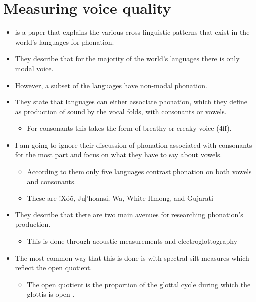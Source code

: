 \section{Measuring voice quality} \label{sec:measuring_voice_quality}




\begin{itemize}
    \item \citet{espositoCrosslinguisticPatternsPhonation2020} is a paper that explains the various cross-linguistic patterns that exist in the world's languages for phonation. 
    \item They describe that for the majority of the world's languages there is only modal voice. 
    \item However, a subset of the languages have non-modal phonation. 
    \item They state that languages can either associate phonation, which they define as production of sound by the vocal folds, with consonants or vowels. 
    \begin{itemize}
        \item For consonants this takes the form of breathy or creaky voice (4ff).
    \end{itemize}
    \item I am going to ignore their discussion of phonation associated with consonants for the most part and focus on what they have to say about vowels. 
    \begin{itemize}
        \item According to them only five languages contrast phonation on both vowels and consonants. 
        \item These are !Xóõ, Ju|'hoansi, Wa, White Hmong, and Gujarati
    \end{itemize}
    \item They describe that there are two main avenues for researching phonation's production. 
    \begin{itemize}
        \item This is done through acoustic measurements and electroglottography
    \end{itemize}
    \item The most common way that this is done is with spectral silt measures which reflect the open quotient.
    \begin{itemize}
        \item The open quotient is the proportion of the glottal cycle during which the glottis is open \citep{holmbergComparisonsAerodynamicElectroglottographic1995}. 

\end{itemize}
\end{itemize}
